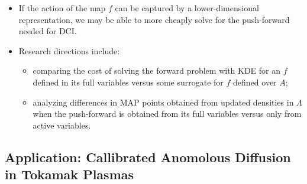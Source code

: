 \documentclass[11pt]{beamer}
\begin{document}
\begin{frame}

\begin{itemize}

	\item If the action of the map $f$ can be captured by a lower-dimensional representation, we may be able to more cheaply solve for the push-forward needed for DCI. 
	
	\item Research directions include: 
	
	\begin{itemize}
	

		\item comparing the cost of solving the forward problem with KDE for an $f$ defined in its full variables versus some surrogate for $f$ defined over $A$; 
		
		\item analyzing differences in MAP points obtained from updated densities in $\Lambda$ when the push-forward is obtained from its full variables versus only from active variables.

	\end{itemize}		

\end{itemize}


\end{frame}

\subsection{Application: Callibrated Anomolous Diffusion in Tokamak Plasmas}
\end{document}
